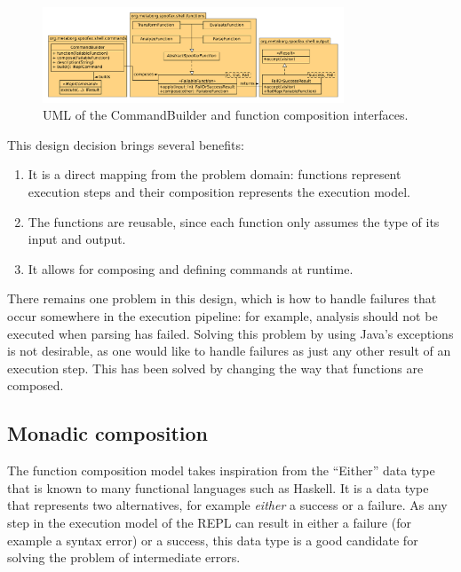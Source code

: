 \begin{figure}[b]
  \centering
  \includegraphics[width=0.8\textwidth]{uml-function-comp}
  \caption{UML of the CommandBuilder and function composition
    interfaces.}
  \label{fig:uml-function-comp}
\end{figure}

This design decision brings several benefits:

\begin{enumerate}
\item It is a direct mapping from the problem domain: functions
  represent execution steps and their composition represents the
  execution model.
\item The functions are reusable, since each function only assumes
  the type of its input and output.
\item It allows for composing and defining commands at runtime. 
\end{enumerate}

There remains one problem in this design, which is how to handle
failures that occur somewhere in the execution pipeline: for example,
analysis should not be executed when parsing has failed. Solving this
problem by using Java's exceptions is not desirable, as one would like
to handle failures as just any other result of an execution step. This
has been solved by changing the way that functions are composed.

\subsection{Monadic composition}
\label{sec:monadic-composition}
The function composition model takes inspiration from the ``Either''
data type that is known to many functional languages such as
Haskell. It is a data type that represents two alternatives, for
example \textit{either} a success or a failure. As any step in the
execution model of the REPL can result in either a failure (for
example a syntax error) or a success, this data type is a good
candidate for solving the problem of intermediate errors.

